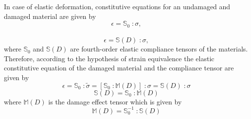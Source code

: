 \documentclass[12pt,twoside]{report}
\begin{document}
In case of elastic deformation, constitutive equations for an undamaged and damaged material are given by
\begin{equation}
\epsilon = \mathbb{S}_{0}\; : \sigma,
\end{equation}\\
\begin{equation}
\epsilon = \mathbb{S}(D)\; : \sigma,
\end{equation}
where $\mathbb{S}_{0}$ and $\mathbb{S}(D)$  are fourth-order elastic compliance tensors of the materials. Therefore, according to the hypothesis of strain equivalence the elastic constitutive equation of the damaged material and the compliance tensor are given by 
\begin{equation}
\epsilon = \mathbb{S}_{0}\; : \tilde{\sigma}  =  [\mathbb{S}_{0}\;: \mathbb{M} (D)]\;: \sigma = \mathbb{S}(D)\; : \sigma
\end{equation}
\begin{equation}
\mathbb{S}(D) = \mathbb{S}_{0}\; : \mathbb{M} (D)
 \label{eqn:S_HSeq}
\end{equation}
where $\mathbb{M} (D)$ is the damage effect tensor which is given by 
\begin{equation}
\mathbb{M} (D)  = \mathbb{S}_{0}^{-1} \; : \mathbb{S}(D) 
\end{equation}
\end{document}
